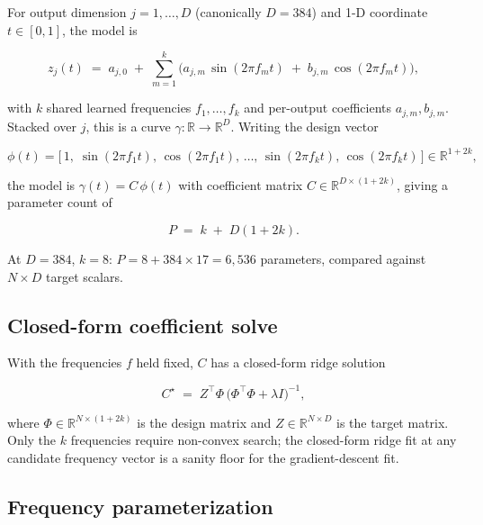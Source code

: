 \documentclass[11pt]{article}
\begin{document}
For output dimension $j = 1, \dots, D$ (canonically $D = 384$) and 1-D
coordinate $t \in [0, 1]$, the model is

\begin{equation}
z_j(t) \;=\; a_{j,0} \;+\; \sum_{m=1}^{k} \Big( a_{j,m}\, \sin(2\pi f_m t)
\;+\; b_{j,m}\, \cos(2\pi f_m t) \Big),
\label{eq:model}
\end{equation}

with $k$ shared learned frequencies $f_1, \dots, f_k$ and per-output
coefficients $a_{j,m}, b_{j,m}$. Stacked over $j$, this is a curve
$\gamma : \mathbb{R} \to \mathbb{R}^D$. Writing the design vector

\begin{equation}
\phi(t) = \big[\, 1,\; \sin(2\pi f_1 t),\, \cos(2\pi f_1 t),\, \dots,\,
\sin(2\pi f_k t),\, \cos(2\pi f_k t) \,\big] \in \mathbb{R}^{1+2k},
\label{eq:design}
\end{equation}

the model is $\gamma(t) = C\, \phi(t)$ with coefficient matrix
$C \in \mathbb{R}^{D \times (1+2k)}$, giving a parameter count of

\begin{equation}
P \;=\; k \;+\; D(1 + 2k).
\label{eq:paramcount}
\end{equation}

At $D = 384$, $k = 8$: $P = 8 + 384 \times 17 = 6{,}536$ parameters, compared
against $N \times D$ target scalars.

\subsection{Closed-form coefficient solve}

With the frequencies $f$ held fixed, $C$ has a closed-form ridge solution

\begin{equation}
C^\star \;=\; Z^\top \Phi \, \big( \Phi^\top \Phi + \lambda I \big)^{-1},
\label{eq:ridge}
\end{equation}

where $\Phi \in \mathbb{R}^{N \times (1+2k)}$ is the design matrix and
$Z \in \mathbb{R}^{N \times D}$ is the target matrix. Only the $k$
frequencies require non-convex search; the closed-form ridge fit at any
candidate frequency vector is a sanity floor for the gradient-descent fit.

\subsection{Frequency parameterization}
\end{document}
